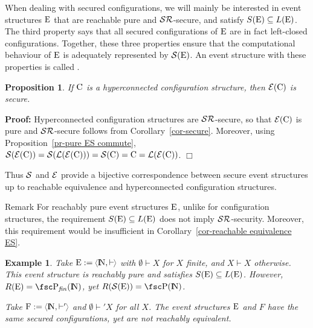 \documentclass[twocolumn]{article}
\makeatletter
\newcommand{\out}[1]{}        \newcommand{\ams}[1]{#1}      \usepackage[preserveurlmacro]{breakurl}
\def\paragraph{\@startsection
   {paragraph}{4}{\z@}{2ex plus 1ex minus .2ex}{-1em}{\normalsize\bf}}
\newtheorem{prop}{Proposition}[section]
\newtheorem{exam}{Example}
\newenvironment{proposition}[1]{\begin{prop} \rm \label{pr-#1} }{\end{prop}}
\newenvironment{example}[1]{\begin{exam} \rm \label{ex-#1} }{\end{exam}}
\newenvironment{proof}{\begin{trivlist} \item[\hspace{\labelsep}\bf
Proof:]}{\hfill $\Box$\end{trivlist}}
\newcommand{\pr}[1]{Proposition~\ref{pr-#1}}
\newcommand{\cor}[1]{Corollary~\ref{cor-#1}}
\newcommand{\phrase}[1]{\index{#1}{\em #1}}		\newcommand{\implies}{\Rightarrow}
\newcommand{\dl}[1]{\mbox{\rm I\hspace{-0.75mm}#1}}     \newcommand{\dc}[1]{\mbox{\rm {\raisebox{.4ex}{\makebox [0pt][l]{\hspace{.2em}\scriptsize $\mid$}}}#1}}
\newcommand{\IN}{\dl{N}}                        \newcommand{\IQ}{\dc{Q}}                        \newcommand{\IC}{\dc{C}}                        \newcommand{\IE}{\dl{E}}                        \newcommand{\IG}{\dc{G}}                        \newcommand{\fC}{{\cal C}}                      \newcommand{\fE}{{\cal E}}                      \newcommand{\fG}{{\cal G}}                      \newcommand{\fN}{{\cal N}}                      \newcommand{\fF}{{\cal F}}                      \newcommand{\fL}{{\cal L}}                      \newcommand{\fM}{{\cal M}}                      \newcommand{\fS}{{\cal S}}                      \newcommand{\fR}{{\cal R}}                      \newcommand{\eC}{{\rm C}}                       \newcommand{\eD}{{\rm D}}                       \newcommand{\eE}{{\rm E}}                       \newcommand{\eF}{{\rm F}}                       \newcommand{\eG}{{\rm G}}                       \newcommand{\eH}{{\rm H}}                       \newcommand{\eK}{{\rm K}}                       \newcommand{\eL}{{\rm L}}                       \newcommand{\eN}{{\rm N}}                       \newcommand{\eP}{{\rm P}}                       \newcommand{\eM}{{\rm M}}                       \newcommand{\eT}{{\rm T}}                       \newcommand{\fT}{{\cal T}}
\makeatother
\begin{document}
When dealing with secured configurations, we will mainly be interested
in event structures $\eE$ that are reachable pure and
$\fS\fR$-secure, and satisfy $S(\eE) \subseteq L(\eE)$.
The third property says that all secured configurations of $\eE$ are in
fact left-closed configurations. Together, these three properties ensure that the
computational behaviour of $\eE$ is adequately represented by $\fS(\eE)$.
An event structure with these properties is called \phrase{secure}.

\begin{proposition}{hyperconnected secure}
If $\eC$ is a hyperconnected configuration structure, then $\fE(\eC)$
is secure.
\end{proposition}

\begin{proof}
Hyperconnected configuration structures are $\fS\fR$-secure, so
that $\fE(\eC)$ is pure and $\fS\fR$-secure follows from \cor{secure}.
Moreover, using \pr{pure ES commute},
$\fS(\fE(\eC)) = \fS(\fL(\fE(\eC))) = \fS(\eC) = \eC = \fL(\fE(\eC))$.
\end{proof}
Thus $\fS$ and $\fE$ provide a bijective correspondence between secure
event structures up to reachable equivalence and hyperconnected
configuration structures.

\out{
 \begin{example}{insecure analogies}
 Take $\eE\mathbin=\tuple{\IN,\vdash\:}$ with $\emptyset\, \mathbin\vdash \{0\}$, $\{n\}
 \mathbin\vdash \{n\mathord+1\}$, $\emptyset \vdash X$ for all finite $X$ with $|X|\neq
 1$, and $X\vdash X$ for $X$ infinite. This event structure is secure.
 However, $\IN \not\in L(\hat\eE)$, so
 $\hat\eE$ does not satisfy $S(\hat\eE)\subseteq L(\hat\eE)$.
 \end{example}
}

\paragraph{Remark}
For reachably pure event structures $\eE$, unlike for configuration
structures, the requirement $S(\eE) \subseteq L(\eE)$ does not imply
$\fS\fR$-security. Moreover, this requirement would be insufficient in
\cor{reachable equivalence ES}.

\begin{example}{insecure ES}
Take $\eE:=\tuple{\IN,\vdash\:}$ with $\emptyset \vdash X$ for
$X$ finite, and $X\vdash X$ otherwise. This event structure is reachably pure
and satisfies $S(\eE)\subseteq L(\eE)$. However, $R(\eE)=\pow_{\it fin}(\IN)$,
yet $R(\fS(\eE))=\pow(\IN)$.

Take $\eF:=\tuple{\IN,\vdash'\;}$ and $\emptyset \vdash' X$ for all
$X$.  The event structures $\eE$ and $F$ have the same secured
configurations, yet are not reachably equivalent.
\end{example}
\end{document}
